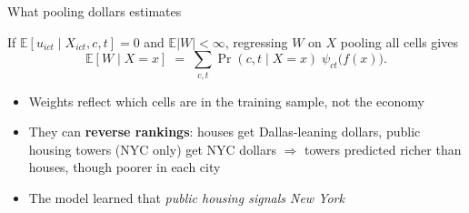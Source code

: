 \documentclass[10pt,aspectratio=169]{beamer}
\newcommand{\E}{\mathbb{E}}
\begin{document}
\begin{frame}{What pooling dollars estimates}
\begin{resultbox}
If $\E[u_{ict}\mid X_{ict},c,t]=0$ and $\E|W|<\infty$, regressing $W$ on $X$ pooling all cells gives
\[
  \E[W\mid X=x] \;=\; \sum_{c,t}\Pr(c,t\mid X=x)\;\psi_{ct}\big(f(x)\big).
\]
\end{resultbox}
\pause
\begin{itemize}
  \item Weights reflect which cells are in the training sample, not the economy
  \item They can \textbf{reverse rankings}: houses get Dallas-leaning dollars, public housing towers (NYC only) get NYC dollars $\Rightarrow$ towers predicted richer than houses, though poorer in each city
  \item The model learned that \emph{public housing signals New York}
\end{itemize}
\end{frame}
\end{document}
